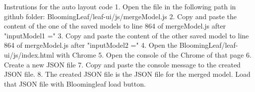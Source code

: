 Instrutions for the auto layout code
1. Open the file in the following path in github folder: BloomingLeaf/leaf-ui/js/mergeModel.js
2. Copy and paste the content of the one of the saved models to line 864 of mergeModel.js after "inputModel1 ="
3. Copy and paste the content of the other saved model to line 864 of mergeModel.js after "inputModel2 ="
4. Open the BloomingLeaf/leaf-ui/js/index.html with Chrome
5. Open the console of the Chrome of that page
6. Create a new JSON file
7. Copy and paste the console message to the created JSON file. 
8. The created JSON file is the JSON file for the merged model. Load that JSON file with Bloomingleaf load button. 
